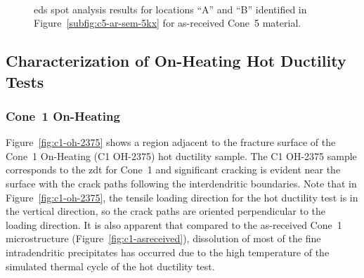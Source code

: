 {\begin{figure}
    \centering
     \\
    \caption[]{\Gls{eds} spot analysis results for locations ``A'' and ``B'' identified in Figure~\ref{subfig:c5-ar-sem-5kx} for as-received Cone~5 material.}
    \label{fig:c5-ar-eds}
\end{figure}


\subsection{Characterization of On-Heating Hot Ductility Tests}
\subsubsection{Cone~1 On-Heating}
Figure~\ref{fig:c1-oh-2375} shows a region adjacent to the fracture surface of the Cone~1 On-Heating  (C1 OH-2375) hot ductility sample. The C1 OH-2375 sample corresponds to the \gls{zdt} for Cone~1 and significant cracking is evident near the surface with the crack paths following the interdendritic boundaries. Note that in Figure~\ref{fig:c1-oh-2375}, the tensile loading direction for the hot ductility test is in the vertical direction, so the crack paths are oriented perpendicular to the loading direction. It is also apparent that compared to the as-received Cone~1 microstructure (Figure~\ref{fig:c1-asreceived}), dissolution of most of the fine intradendritic precipitates has occurred due to the high temperature of the simulated thermal cycle of the hot ductility test.

}
